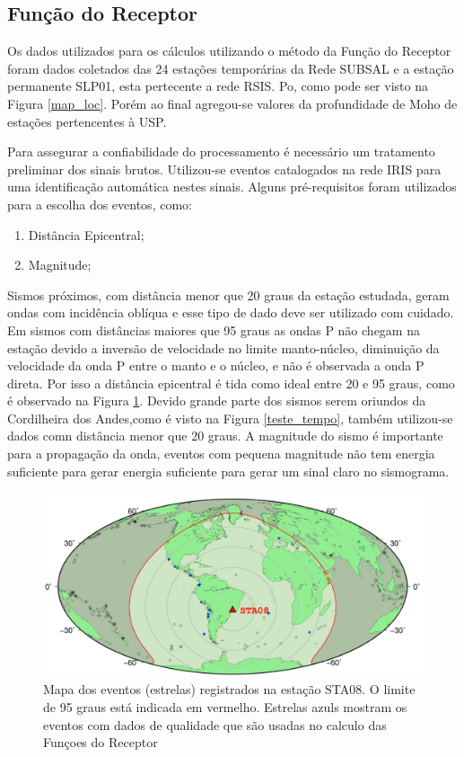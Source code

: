 \subsection{Função do Receptor}

Os dados utilizados para os cálculos utilizando o método da Função do Receptor foram dados coletados das 24 estações temporárias da Rede SUBSAL e a estação permanente SLP01, esta pertecente a rede RSIS. Po, como pode ser visto na Figura \ref{map_loc}. Porém ao final agregou-se valores da profundidade de Moho de estações pertencentes à USP. 

Para assegurar a confiabilidade do processamento é necessário um tratamento preliminar dos sinais brutos. Utilizou-se eventos catalogados na rede IRIS para uma identificação automática nestes sinais. Alguns pré-requisitos foram utilizados para a escolha dos eventos, como:

\begin{enumerate}
\item Distância Epicentral;
\item Magnitude;
\end{enumerate}

Sismos próximos, com distância menor que 20 graus da estação estudada, geram ondas com incidência oblíqua e esse tipo de dado deve ser utilizado com cuidado. Em sismos com distâncias maiores que 95 graus as ondas P não chegam na estação devido a inversão de velocidade no limite manto-núcleo, diminuição da velocidade da onda P entre o manto e o núcleo, e não é observada a onda P direta. Por isso a distância epicentral é tida como ideal entre 20 e 95 graus, como é observado na Figura \ref{mapa_eventos}. Devido grande parte dos sismos serem oriundos da Cordilheira dos Andes,como é visto na Figura \ref{teste_tempo}, também utilizou-se dados comn distância menor que 20 graus. A magnitude do sismo é importante para a propagação da onda, eventos com pequena magnitude não tem energia suficiente para gerar energia suficiente para gerar um sinal claro no sismograma.

\begin{figure}[!ht]
\centering
\includegraphics[scale=0.6]{mapa_de_eventos.png}
\caption{Mapa dos eventos (estrelas) registrados na estação STA08. O limite de 95 graus está indicada em vermelho. Estrelas azuls mostram os eventos com dados de qualidade que são usadas no calculo das Funçoes do Receptor}
\label{mapa_eventos}
\end{figure}


